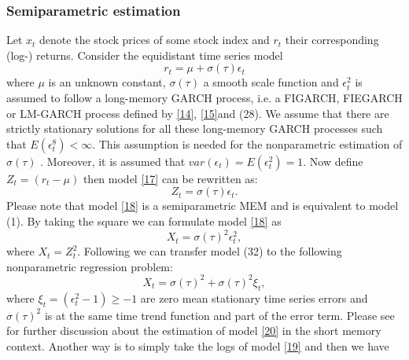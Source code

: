 \documentclass[12pt]{article}
\begin{document}
\subsubsection{Semiparametric estimation}
 Let $x_t$ denote the stock prices of some stock index and $r_t$ their corresponding (log-) returns. Consider the equidistant time series model
\begin{equation}
\label{17}
	r_t=\mu +\sigma(\tau)\epsilon_t
\end{equation}
where $\mu$ is an unknown constant, $\sigma(\tau)$ a smooth scale function and $\epsilon_t^2$ is assumed to follow a long-memory GARCH process, i.e. a FIGARCH, FIEGARCH or LM-GARCH process defined by \eqref{14}, \eqref{15}and (28). We assume that there are strictly stationary solutions for all these long-memory GARCH processes such that $E(\epsilon_t^8)<\infty$. This assumption is needed for the nonparametric estimation of $\sigma(\tau)$ \citep{feng2004simultaneously}. Moreover, it is assumed that $var(\epsilon_t)=E(\epsilon_t^2)=1$.
 Now define $Z_t=(r_t-\mu)$ then model \eqref{17} can be rewritten as:
\begin{equation}
\label{18}
	Z_t=\sigma(\tau)\epsilon_t.
\end{equation}
Please note that model \eqref{18} is a semiparametric MEM and is equivalent to model (1). By taking the square we can formulate model \eqref{18} as
\begin{equation}
\label{19}
	X_t=\sigma(\tau)^2\epsilon_t^2,
\end{equation}
where $X_t=Z_t^2$. Following \citet{feng2004simultaneously} we can transfer model (32) to the following nonparametric regression problem:
\begin{equation}
\label{20}
	X_t=\sigma(\tau)^2+\sigma(\tau)^2\xi_t,
\end{equation}
where $\xi_t=(\epsilon_t^2-1)\geq -1$ are zero mean stationary time series errors and $\sigma(\tau)^2$ is at the same time trend function and part of the error term. Please see \citet{feng2004simultaneously} for further discussion about the estimation of model \eqref{20} in the short memory context. Another way is to simply take the logs of model \eqref{19} and then we have
\end{document}
